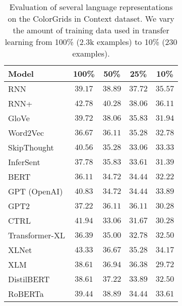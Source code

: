 \documentclass[11pt,a4paper]{article}
\begin{document}
\begin{table*}[t!]
\centering
\begin{tabular}{lcccc}
\hline
\textbf{Model} & \textbf{100\%} & \textbf{50\%} & \textbf{25\%} & \textbf{10\%} \\
\hline
RNN & $39.17$ & $38.89$ & $37.72$ & $35.57$ \\
RNN+ & $42.78$ & $\mathbf{40.28}$ & $\mathbf{38.06}$ & $\mathbf{36.11}$ \\
GloVe & $39.72$ & $38.06$ & $35.83$ & $31.94$ \\
Word2Vec & $36.67$ & $36.11$ & $35.28$ & $32.78$ \\
SkipThought & $40.56$ & $35.28$ & $33.06$ & $33.33$ \\
InferSent & $37.78$ & $35.83$ & $33.61$ & $31.39$ \\
BERT & $36.11$ & $34.72$ & $34.44$ & $32.22$ \\
GPT (OpenAI) & $40.83$ & $34.72$ & $34.44$ & $33.89$ \\
GPT2 & $37.22$ & $36.11$ & $36.11$ & $30.28$ \\
CTRL & $41.94$ & $33.06$ & $31.67$ & $30.28$ \\
Transformer-XL & $36.39$ & $35.00$ & $32.78$ & $32.50$ \\
XLNet & $\mathbf{43.33}$ & $36.67$ & $35.28$ & $34.17$ \\
XLM & $38.61$ & $36.94$ & $36.38$ & $29.72$ \\
DistilBERT & $38.61$ & $37.22$ & $33.89$ & $32.50$ \\
RoBERTa & $39.44$ & $38.89$ & $34.44$ & $33.61$ \\
\hline
\end{tabular}
\caption{\label{table:colors} Evaluation of several language representations on the ColorGrids in Context dataset. We vary the amount of training data used in transfer learning from 100\% (2.3k examples) to 10\% (230 examples).}
\end{table*}
\end{document}
